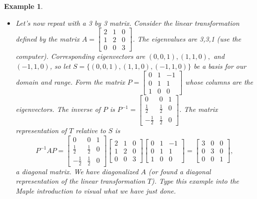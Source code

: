 \documentclass[10pt]{article}
\theoremstyle{plain}
\theoremstyle{box}
\newtheorem{example}{Example}
\begin{document}
\begin{example}
\begin{itemize}
\item
Let's now repeat with a 3 by 3 matrix. 
Consider the linear transformation defined by the matrix
$A=  
\begin{bmatrix}
 2 & 1 & 0 \\
 1 & 2 & 0 \\
 0 & 0 & 3
\end{bmatrix} 
$. The eigenvalues are 3,3,1 (use the computer). Corresponding eigenvectors are $(0,0,1), (1,1,0),$ and $(-1,1,0)$, so let $S=\{(0,0,1), (1,1,0),(-1,1,0)\}$ be a basis for our domain and range.  Form the matrix 
$P=
\begin{bmatrix}
 0 & 1 & -1 \\
 0 & 1 & 1 \\
 1 & 0 & 0
\end{bmatrix} 
$ whose columns are the eigenvectors. The inverse of $P$ is 
$P^{-1} = 
\begin{bmatrix}
 0 & 0 & 1 \\
 \frac{1}{2} & \frac{1}{2} & 0 \\
 -\frac{1}{2} & \frac{1}{2} & 0
\end{bmatrix} 
$. The matrix representation of $T$ relative to $S$ is 
$$
P^{-1}AP=
\begin{bmatrix}
 0 & 0 & 1 \\
 \frac{1}{2} & \frac{1}{2} & 0 \\
 -\frac{1}{2} & \frac{1}{2} & 0
\end{bmatrix} 
 \begin{bmatrix}
 2 & 1 & 0 \\
 1 & 2 & 0 \\
 0 & 0 & 3
\end{bmatrix} 
\begin{bmatrix}
 0 & 1 & -1 \\
 0 & 1 & 1 \\
 1 & 0 & 0
\end{bmatrix} 
=
\begin{bmatrix}
 3 & 0 & 0 \\
 0 & 3 & 0 \\
 0 & 0 & 1
\end{bmatrix} 
,$$ a diagonal matrix.  We have diagonalized $A$ (or found a diagonal representation of the linear transformation $T$). Type this example into the Maple introduction to visual what we have just done.


\end{itemize}
\end{example}
\end{document}
